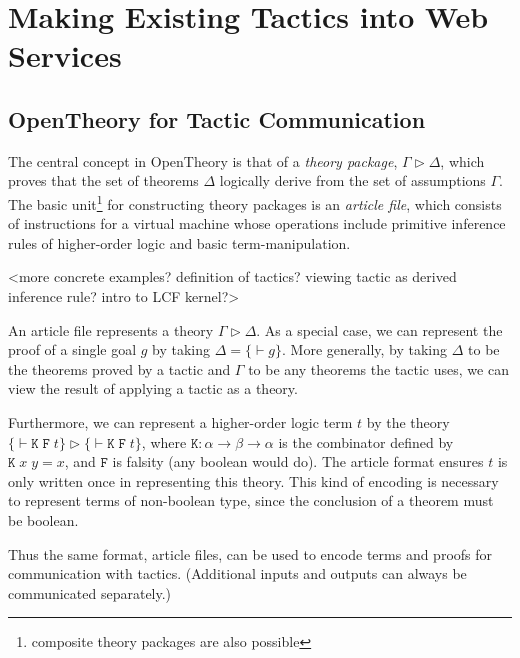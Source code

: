 \documentclass{llncs}
\newcommand{\OpenTheory}{OpenTheory\xspace}
\begin{document}
\section{Making Existing Tactics into Web Services}
\label{sec:implementation}

\subsection{\OpenTheory for Tactic Communication}
The central concept in \OpenTheory is that of a \emph{theory package}, $\Gamma\rhd\Delta$, which proves that the set of theorems $\Delta$ logically derive from the set of assumptions $\Gamma$.
The basic unit\footnote{composite theory packages are also possible} for constructing theory packages is an \emph{article file}, which consists of instructions for a virtual machine whose operations include primitive inference rules of higher-order logic and basic term-manipulation.

<more concrete examples? definition of tactics? viewing tactic as derived inference rule? intro to LCF kernel?>

An article file represents a theory $\Gamma\rhd\Delta$.
As a special case, we can represent the proof of a single goal $g$ by taking $\Delta=\{\vdash g\}$.
More generally, by taking $\Delta$ to be the theorems proved by a tactic and $\Gamma$ to be any theorems the tactic uses, we can view the result of applying a tactic as a theory.

Furthermore, we can represent a higher-order logic term $t$ by the theory $\{\vdash\mathtt{K\;F\;}t\}\rhd\{\vdash\mathtt{K\;F\;}t\}$, where $\mathtt{K}:\alpha\to\beta\to\alpha$ is the combinator defined by $\mathtt{K}\;x\;y=x$, and $\mathtt{F}$ is falsity (any boolean would do).
The article format ensures $t$ is only written once in representing this theory.
This kind of encoding is necessary to represent terms of non-boolean type, since the conclusion of a theorem must be boolean.

Thus the same format, article files, can be used to encode terms and proofs for communication with tactics.
(Additional inputs and outputs can always be communicated separately.)
\end{document}
